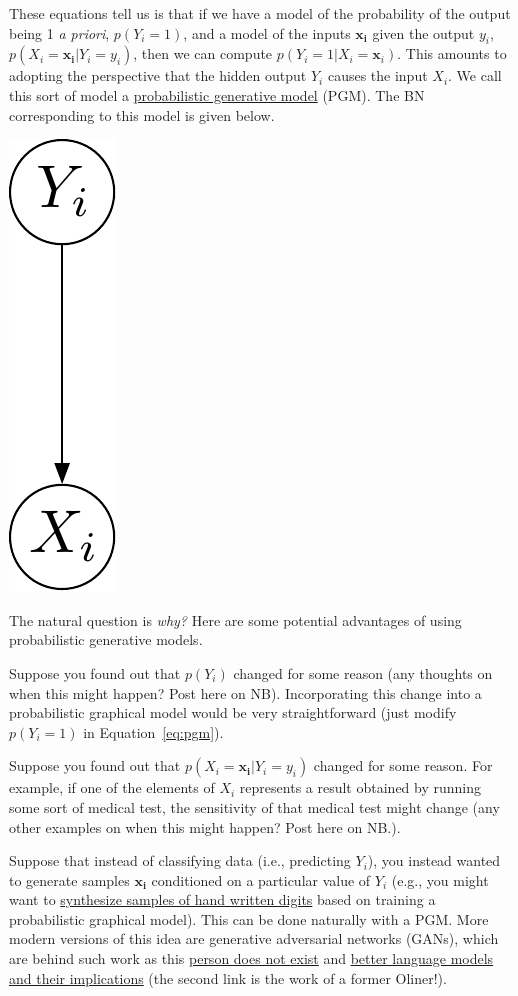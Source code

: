 \documentclass[assignment03_Solutions]{subfiles}
\begin{document}
These equations tell us is that if we have a model of the probability of the output being 1 \emph{a priori}, $p(Y_i = 1)$, and a model of the inputs $\mathbf{x_i}$ given the output $y_i$, $p(X_i = \mathbf{x_i} | Y_i = y_i)$, then we can compute $p(Y_i = 1 | X_i = \mathbf{x}_i)$.  This amounts to adopting the perspective that the hidden output $Y_i$ causes the input $X_i$.  We call this sort of model a \href{https://en.wikipedia.org/wiki/Generative_model}{probabilistic generative model} (PGM).  The BN corresponding to this model is given below.

\begin{center}
\includegraphics[width=0.05\linewidth]{figures/pgm}
\end{center}


The natural question is \emph{why?} Here are some potential advantages of using probabilistic generative models.
\bi
\item Suppose you found out that $p(Y_i)$ changed for some reason (any thoughts on when this might happen?  Post here on NB).  Incorporating this change into a probabilistic graphical model would be very straightforward (just modify $p(Y_i =1)$ in Equation~\ref{eq:pgm}).
\item Suppose you found out that $p(X_i  = \mathbf{x_i} | Y_i = y_i)$ changed for some reason.  For example, if one of the elements of $X_i$ represents a result obtained by running some sort of medical test, the sensitivity of that medical test might change (any other examples on when this might happen? Post here on NB.).
\item Suppose that instead of classifying data (i.e., predicting $Y_i$), you instead wanted to generate samples $\mathbf{x_i}$ conditioned on a particular value of $Y_i$ (e.g., you might want to \href{https://www.youtube.com/watch?v=LzE1fF0_3q0}{synthesize samples of hand written digits} based on training a probabilistic graphical model).  This can be done naturally with a PGM.  More modern versions of this idea are generative adversarial networks (GANs), which are behind such work as this \href{https://thispersondoesnotexist.com/}{person does not exist} and \href{https://openai.com/blog/better-language-models/}{better language models and their implications} (the second link is the work of a former Oliner!).
\ei
\end{document}
